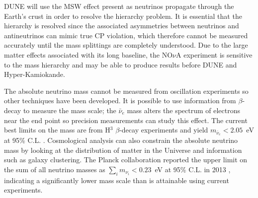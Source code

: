 DUNE will use the MSW effect present as neutrinos propagate through the Earth's crust in order to resolve the hierarchy problem.  It is essential that the hierarchy is resolved since the associated asymmetries between neutrinos and antineutrinos can mimic true CP violation, which therefore cannot be measured accurately until the mass splittings are completely understood.  Due to the large matter effects associated with its long baseline, the NO$\nu$A experiment is sensitive to the mass hierarchy and may be able to produce results before DUNE and Hyper-Kamiokande.

The absolute neutrino mass cannot be measured from oscillation experiments so other techniques have been developed.  It is possible to use information from $\beta$-decay to measure the mass scale; the $\bar{\nu}_e$ mass alters the spectrum of electrons near the end point so precision measurements can study this effect.  The current best limits on the mass are from H$^3$ $\beta$-decay experiments and yield $m_{\bar{\nu}_e} < 2.05$~eV at 95\% C.L. \cite{Triotsk2011,Mainz2005}.  Cosmological analysis can also constrain the absolute neutrino mass by looking at the distribution of matter in the Universe and information such as galaxy clustering.  The Planck collaboration reported the upper limit on the sum of all neutrino masses as $\sum_i m_{\nu_i} < 0.23$~eV at 95\% C.L. in 2013 \cite{Planck2013}, indicating a significantly lower mass scale than is attainable using current experiments.
